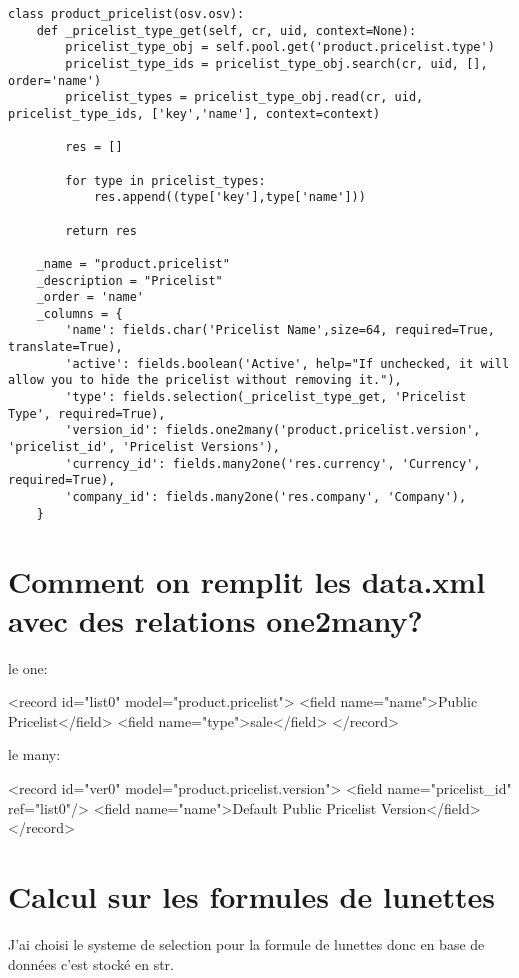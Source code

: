 \documentclass[12pt,a4paper]{article}
\begin{document}
\begin{verbatim}
class product_pricelist(osv.osv):
    def _pricelist_type_get(self, cr, uid, context=None):
        pricelist_type_obj = self.pool.get('product.pricelist.type')
        pricelist_type_ids = pricelist_type_obj.search(cr, uid, [], order='name')
        pricelist_types = pricelist_type_obj.read(cr, uid, pricelist_type_ids, ['key','name'], context=context)

        res = []

        for type in pricelist_types:
            res.append((type['key'],type['name']))

        return res

    _name = "product.pricelist"
    _description = "Pricelist"
    _order = 'name'
    _columns = {
        'name': fields.char('Pricelist Name',size=64, required=True, translate=True),
        'active': fields.boolean('Active', help="If unchecked, it will allow you to hide the pricelist without removing it."),
        'type': fields.selection(_pricelist_type_get, 'Pricelist Type', required=True),
        'version_id': fields.one2many('product.pricelist.version', 'pricelist_id', 'Pricelist Versions'),
        'currency_id': fields.many2one('res.currency', 'Currency', required=True),
        'company_id': fields.many2one('res.company', 'Company'),
    }
\end{verbatim}

\section{Comment on remplit les data.xml avec des relations one2many?}
\label{sec:data_one2many}
le one:

<record id="list0" model="product.pricelist">
     <field name="name">Public Pricelist</field>
     <field name="type">sale</field>
</record>

le many: 

<record id="ver0" model="product.pricelist.version">
    <field name="pricelist\_id" ref="list0"/>
    <field name="name">Default Public Pricelist Version</field>
</record>


\section{Calcul sur les formules de lunettes}
\label{sec:calcule}

J'ai choisi le systeme de selection pour la formule de lunettes donc en base de données c'est stocké en str. 
\end{document}

